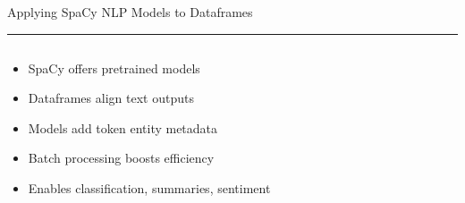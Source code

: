 \documentclass[aspectratio=169]{beamer}
\newcommand{\TitleFont}{\rmfamily}
\begin{document}
\begin{frame}[t]{}
  \vspace*{0.5cm}
  {\TitleFont\fontsize{18}{22}\selectfont\color{LUBronze}Applying SpaCy NLP Models to Dataframes\par}
  \vspace{0.3em}
  {\color{LUBronze}\rule{\linewidth}{0.8pt}}\par
  \vspace{0.2cm}
  \begin{columns}[t]
    \begin{column}[t]{0.45\textwidth}
      \vspace*{0pt}
      \begin{itemize}\setlength\itemsep{0.65em}
        \item SpaCy offers pretrained models
        \item Dataframes align text outputs
        \item Models add token entity metadata
        \item Batch processing boosts efficiency
        \item Enables classification, summaries, sentiment
      \end{itemize}
    \end{column}
  \end{columns}
\end{frame}
\end{document}
